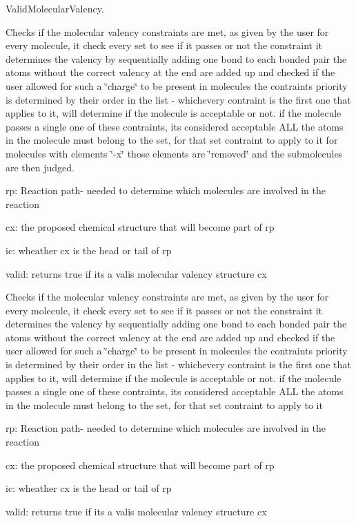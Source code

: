 Valid\+Molecular\+Valency. 

Checks if the molecular valency constraints are met, as given by the user for every molecule, it check every set to see if it passes or not the constraint it determines the valency by sequentially adding one bond to each bonded pair the atoms without the correct valency at the end are added up and checked if the user allowed for such a \char`\"{}charge\char`\"{} to be present in molecules the contraints priority is determined by their order in the list -\/ whichevery contraint is the first one that applies to it, will determine if the molecule is acceptable or not. if the molecule passes a single one of these contraints, its considered acceptable A\+LL the atoms in the molecule must belong to the set, for that set contraint to apply to it for molecules with elements \char`\"{}-\/x\char`\"{} those elements are \char`\"{}removed\char`\"{} and the submolecules are then judged.


\begin{DoxyItemize}
\item rp\+: Reaction path-\/ needed to determine which molecules are involved in the reaction
\item cx\+: the proposed chemical structure that will become part of rp
\item ic\+: wheather cx is the head or tail of rp
\item valid\+: returns true if its a valis molecular valency structure cx
\end{DoxyItemize}

Checks if the molecular valency constraints are met, as given by the user for every molecule, it check every set to see if it passes or not the constraint it determines the valency by sequentially adding one bond to each bonded pair the atoms without the correct valency at the end are added up and checked if the user allowed for such a \char`\"{}charge\char`\"{} to be present in molecules the contraints priority is determined by their order in the list -\/ whichevery contraint is the first one that applies to it, will determine if the molecule is acceptable or not. if the molecule passes a single one of these contraints, its considered acceptable A\+LL the atoms in the molecule must belong to the set, for that set contraint to apply to it


\begin{DoxyItemize}
\item rp\+: Reaction path-\/ needed to determine which molecules are involved in the reaction
\item cx\+: the proposed chemical structure that will become part of rp
\item ic\+: wheather cx is the head or tail of rp
\item valid\+: returns true if its a valis molecular valency structure cx 
\end{DoxyItemize}

